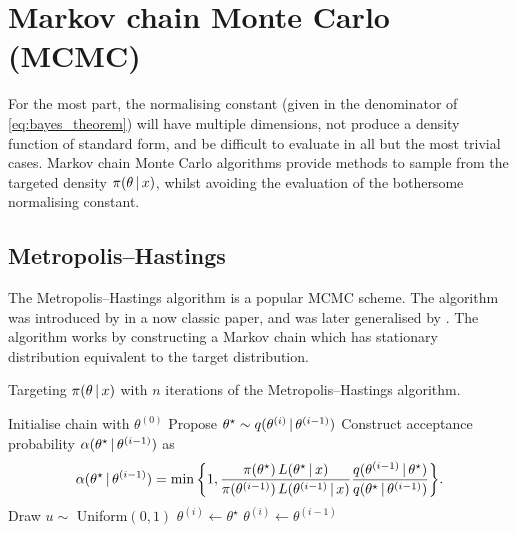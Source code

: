 \section{Markov chain Monte Carlo (MCMC)}
\label{sec:mcmc}

For the most part, the normalising constant (given in the denominator of
\cref{eq:bayes_theorem}) will have multiple dimensions, not produce a density function of
standard form, and be difficult to evaluate in all but the most trivial cases. Markov
chain Monte Carlo algorithms provide methods to sample from the targeted density
$\pi(\theta \,|\, x)$, whilst avoiding the evaluation of the bothersome normalising
constant.

\subsection{Metropolis--Hastings}
\label{ssec:metropolis_hastings}

The Metropolis--Hastings algorithm is a popular MCMC scheme. The algorithm was introduced
by \textcite{metropolis53} in a now classic paper, and was later generalised by
\textcite{hastings70}. The algorithm works by constructing a Markov chain which has
stationary distribution equivalent to the target distribution.

\begin{algorithm}
  \caption{Targeting $\pi(\theta \,|\, x)$ with $n$ iterations of the
    Metropolis--Hastings algorithm.}
  \label{alg:metropolis_hastings}
  \begin{algorithmic}[1]
    \State Initialise chain with $\theta^{(0)}$
      \State Propose ${\theta}^\star \sim q(\theta^{(i)} \,|\, \theta^{(i-1)})$
      \State Construct acceptance probability $\alpha(\theta^\star \,|\, \theta^{(i-1)})$ as
      \begin{equation*}
          \alpha(\theta^\star \given \theta^{(i-1)}) =
        \min\bigg\{1,
        \frac{\pi(\theta^\star) \, L(\theta^\star \given  x)}%
        {\pi(\theta^{(i-1)}) \, L(\theta^{(i-1)} \given  x)}
        \frac{q(\theta^{(i-1)} \given \theta^\star)}%
        {q(\theta^\star \given \theta^{(i-1)})}
        \bigg\}.
      \end{equation*}
      \State Draw $u \sim$ Uniform$(0, 1)$
        \State {}
        \State $\theta^{(i)} \leftarrow \theta^\star$
      \Else
        \State {}
        \State $\theta^{(i)} \leftarrow \theta^{(i-1)}$
      \EndIf
    \EndFor
  \end{algorithmic}
\end{algorithm}

